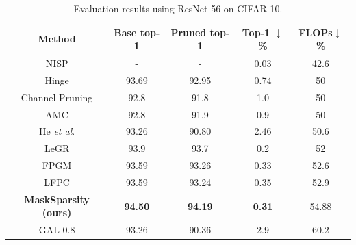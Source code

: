 \documentclass[review]{cvpr}
\begin{document}
\begin{table}[ht]\small
	\caption{Evaluation results using ResNet-56 on CIFAR-10.}

	\setlength{\tabcolsep}{0.01em}
	\begin{center}
		\begin{tabular}{ccccc}	
			\hline
			
			Method 							&Base top-1		&Pruned top-1	& Top-1 $\downarrow$\% 	&FLOPs$\downarrow$\%	 			\\
 			 \hline
			
		
			
		    NISP \cite{yu2018nisp}   &-         &-   &0.03 &42.6 \\
			
            Hinge \cite{Hinge}   &93.69        &92.95   &0.74            &50       \\
			Channel Pruning \cite{he2017channel}	&	92.8	&	91.8			&	1.0 	&	50		\\
			AMC \cite{he2018amc}					&	92.8	&	91.9			&	0.9		&	50		\\
			He \emph{et al}. \cite{he2017channel}    &93.26      &90.80   &2.46             &50.6       \\
			
			LeGR \cite{LeGR}   &93.9        &93.7   &0.2            &52 \\
			
			
			FPGM \cite{FPGM}						&	93.59	&93.26	&	0.33	&	52.6\\
			LFPC \cite{he2020learning}				&	93.59	&93.24	&	0.35	&	52.9\\
			\textbf{MaskSparsity (ours)}			&	\textbf{94.50}	&	\textbf{94.19}	&\textbf{0.31}	& 54.88	\\	
			GAL-0.8 \cite{GAL}   &93.26      &90.36     &2.9         &60.2  \\
			

\end{tabular}
\end{center}
\end{table}
\end{document}
